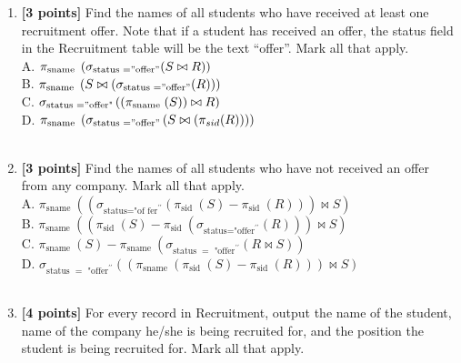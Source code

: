 \documentclass[10pt]{article}
\begin{document}
\begin{enumerate}
	\item \textbf{[3 points]} Find the names of all students who have received at
	      least one recruitment offer. Note that if a student has received an
	      offer, the status field in the Recruitment table will be the text
	      \textquotedblleft offer\textquotedblright . Mark all that apply.\\
	      A. $\pi_{\text{sname }}\left(\sigma_{\text{status }="\text{offer}"}(S\bowtie R)\right)$\\
	      B. $\pi_{\text{sname }}\left(S\bowtie\left(\sigma_{\text{status }="\text{offer}"}(R)\right)\right)$\\
	      C. $\sigma_{\text{status }="\text{\text{offer}"}}\left(\left(\pi_{\text{sname }}(S)\right)\bowtie R\right)$\\
	      D. $\pi_{\text{sname }}\left(\sigma_{\text{status }="\text{offer}"}\left(S\bowtie\left(\pi_{sid}(R)\right)\right)\right)$\\
	      \\
	\item \textbf{[3 points]} Find the names of all students who have not received
	      an offer from any company. Mark all that apply.\\
	      A. $\pi_{\text{sname }}\left(\left(\sigma_{\text{status="of fer}^{\prime\prime}}\left(\pi_{\text{sid }}(S)-\pi_{\text{sid }}(R)\right)\right)\bowtie S\right)$\\
	      B. $\pi_{\text{sname }}\left(\left(\pi_{\text{sid }}(S)-\pi_{\text{sid }}\left(\sigma_{\text{status="offer}^{\prime\prime}}(R)\right)\right)\bowtie S\right)$\\
	      C. $\pi_{\text{sname }}(S)-\pi_{\text{sname }}\left(\sigma_{\text{status }=\text{ "offer}^{\prime\prime}}(R\bowtie S)\right)$\\
	      D. $\sigma_{\text{status }=\text{ "offer}^{\prime\prime}}\left(\left(\pi_{\text{sname }}\left(\pi_{\text{sid }}(S)-\pi_{\text{sid }}(R)\right)\right)\bowtie S\right)$\\
	      \\
	\item \textbf{[4 points]} For every record in Recruitment, output the name of
	      the student, name of the company he/she is being recruited for, and
	      the position the student is being recruited for. Mark all that apply.\\

\end{enumerate}
\end{document}
